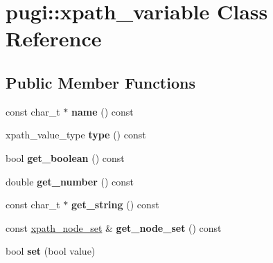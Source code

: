 \hypertarget{classpugi_1_1xpath__variable}{\section{pugi\-:\-:xpath\-\_\-variable Class Reference}
\label{classpugi_1_1xpath__variable}
}
\subsection*{Public Member Functions}
\begin{DoxyCompactItemize}
\item 
\hypertarget{classpugi_1_1xpath__variable_adfee2f69aadd5a9fd36ba67ea9f11c9c}{const char\-\_\-t $\ast$ {\bfseries name} () const }\label{classpugi_1_1xpath__variable_adfee2f69aadd5a9fd36ba67ea9f11c9c}

\item 
\hypertarget{classpugi_1_1xpath__variable_a33713853d1298ce11fb382258ffe11d4}{xpath\-\_\-value\-\_\-type {\bfseries type} () const }\label{classpugi_1_1xpath__variable_a33713853d1298ce11fb382258ffe11d4}

\item 
\hypertarget{classpugi_1_1xpath__variable_a2d562014ddb3c9f0a2d6b8f36f3adc36}{bool {\bfseries get\-\_\-boolean} () const }\label{classpugi_1_1xpath__variable_a2d562014ddb3c9f0a2d6b8f36f3adc36}

\item 
\hypertarget{classpugi_1_1xpath__variable_aad1197f1eecb6072794389eb997d539a}{double {\bfseries get\-\_\-number} () const }\label{classpugi_1_1xpath__variable_aad1197f1eecb6072794389eb997d539a}

\item 
\hypertarget{classpugi_1_1xpath__variable_ab6c9175201e43003c5abcdd3bc426bbf}{const char\-\_\-t $\ast$ {\bfseries get\-\_\-string} () const }\label{classpugi_1_1xpath__variable_ab6c9175201e43003c5abcdd3bc426bbf}

\item 
\hypertarget{classpugi_1_1xpath__variable_aa82f2112e66c7745066788068a14f8f5}{const \hyperlink{classpugi_1_1xpath__node__set}{xpath\-\_\-node\-\_\-set} \& {\bfseries get\-\_\-node\-\_\-set} () const }\label{classpugi_1_1xpath__variable_aa82f2112e66c7745066788068a14f8f5}

\item 
\hypertarget{classpugi_1_1xpath__variable_a1e6ee8876fba9f01373df452416e48fb}{bool {\bfseries set} (bool value)}\label{classpugi_1_1xpath__variable_a1e6ee8876fba9f01373df452416e48fb}


\end{DoxyCompactItemize}
